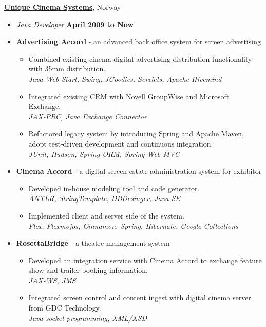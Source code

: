 \documentclass[10pt]{article}
\newenvironment{outerlist}[1][\enskip\textbullet]%
        {\begin{itemize}[#1]}{\end{itemize}%
         \vspace{-.6\baselineskip}}
\newcommand{\blankline}{\quad\pagebreak[2]}
\begin{document}
%
\href{http://www.uniquedigitalcinema.com/}{\textbf{Unique Cinema Systems}}, {Norway}
\begin{outerlist}

\item[] \textit{Java Developer}%
        \hfill \textbf{April 2009 to Now}
\item[] {\textbf{Advertising Accord} - an advanced back office system for screen advertising}
\begin{outerlist}
\item Combined existing cinema digital advertising distribution functionality with 35mm distribution.\\
\textit {Java Web Start, Swing, JGoodies, Servlets, Apache Hivemind}
\item Integrated existing CRM with Novell GroupWise and Microsoft Exchange.\\
\textit {JAX-PRC, Java Exchange Connector}
\item Refactored legacy system by introducing Spring and Apache Maven, adopt test-driven development and continuous integration.\\
\textit {JUnit, Hudson, Spring ORM, Spring Web MVC}
\end{outerlist}

\item[] {\textbf{Cinema Accord} - a digital screen estate administration system for exhibitor}
\begin{outerlist}
\item Developed in-house modeling tool and code generator.\\
\textit {ANTLR, StringTemplate, DBDesinger, Java SE}
\item Implemented client and server side of the system.\\
\textit {Flex, Flexmojos, Cinnamon, Spring, Hibernate, Google Collections}
\end{outerlist}

\item[] {\textbf{RosettaBridge} - a theatre management system}
\begin{outerlist}
\item Developed an integration service with Cinema Accord to exchange feature show and trailer booking information.\\
\textit {JAX-WS, JMS}
\item Integrated screen control and content ingest with digital cinema server from GDC Technology.\\
\textit {Java socket programming, XML/XSD}
\end{outerlist}

\end{outerlist}
\blankline
\end{document}
